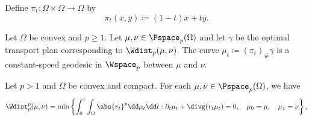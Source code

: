 \documentclass[oneside,reqno,letterpaper]{amsart}
\begin{document}
Define \(\pi_t: \Omega \times \Omega \to \Omega\) by
\[
  \pi_t(x, y) \coloneqq (1 - t) x + t y.
\]

\begin{theorem}
  Let \(\Omega\) be convex and \(p \geq 1\).
  Let \(\mu, \nu \in \Pspace_p(\Omega)\) and let \(\gamma\) be the optimal transport plan corresponding to \(\Wdist_p(\mu, \nu)\).
  The curve \(\mu_t \coloneqq (\pi_t)_{\#} \gamma\) is a constant-speed geodesic in \(\Wspace_p\) between \(\mu\) and \(\nu\).
\end{theorem}


\begin{theorem}
  Let \(p > 1\) and \(\Omega\) be convex and compact.
  For each \(\mu, \nu \in \Pspace_p(\Omega)\), we have
  \[
    \Wdist_p^p(\mu, \nu)
    = \min\left\{
    \int_0^1 \int_{\Omega} \abs{v_t}^p \dd \mu_t \dd t:
    \partial_t \mu_t + \divg(v_t \mu_t) = 0, \quad \mu_0 = \mu, \quad \mu_1 = \nu
    \right\}.
  \]
\end{theorem}
\end{document}
